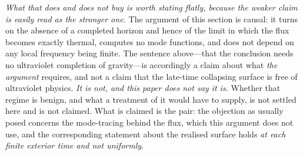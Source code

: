 \documentclass[11pt,a4paper]{article}
\theoremstyle{plain}
\theoremstyle{remark}
\begin{document}
\emph{What that does and does not buy is worth stating flatly, because the weaker claim is easily read as the
stronger one.} The argument of this section is causal: it turns on the absence of a completed horizon and hence
of the limit in which the flux becomes exactly thermal, computes no mode functions, and does not depend on any local frequency being finite.
The sentence above---that the conclusion needs no ultraviolet completion of gravity---is accordingly a claim about
what \emph{the argument} requires, and not a claim that the late-time collapsing surface is free of ultraviolet
physics. \emph{It is not, and this paper does not say it is.} Whether that regime is benign, and what a treatment
of it would have to supply, is not settled here and is not claimed. What is claimed is the
pair: the objection as usually posed concerns the mode-tracing behind the flux, which this argument does not use, and the corresponding
statement about the realised surface holds \emph{at each finite exterior time and not uniformly}.
\end{document}
